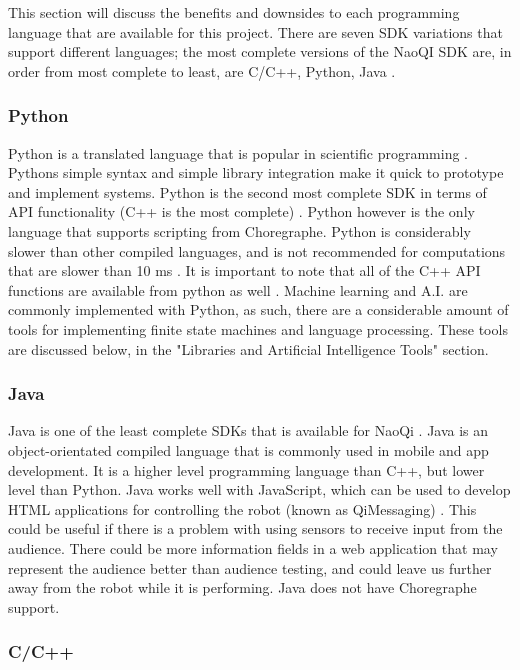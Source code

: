   This section will discuss the benefits and downsides to each programming language that are available for this project. There are seven SDK variations that support different languages; the most complete versions of the NaoQI SDK are, in order from most complete to least, are C/C++, Python, Java \cite{programmingLanguages}.

  \subsubsection{Python}
  Python is a translated language that is popular in scientific programming \cite{Python.org}. Pythons simple syntax and simple library integration make it quick to prototype and implement systems. Python is the second most complete SDK in terms of API functionality (C++ is the most complete) \cite{languageBenefits}. Python however is the only language that supports scripting from Choregraphe. Python is considerably slower than other compiled languages, and is not recommended for computations that are slower than 10 ms \cite{programmingLanguages}. It is important to note that all of the C++ API functions are available from python as well \cite{pythonSDK}. Machine learning and A.I. are commonly implemented with Python, as such, there are a considerable amount of tools for implementing finite state machines and language processing. These tools are discussed below, in the "Libraries and Artificial Intelligence Tools" section.
  \subsubsection{Java}

  Java is one of the least complete SDKs that is available for NaoQi \cite{programmingLanguages}. Java is an object-orientated compiled language that is commonly used in mobile and app development. It is a higher level programming language than C++, but lower level than Python. Java works well with JavaScript, which can be used to develop HTML applications for controlling the robot (known as QiMessaging) \cite{qimessagingjavascript}. This could be useful if there is a problem with using sensors to receive input from the audience. There could be more information fields in a web application that may represent the audience better than audience testing, and could leave us further away from the robot while it is performing. Java does not have Choregraphe support.
  \subsubsection{C/C++}

